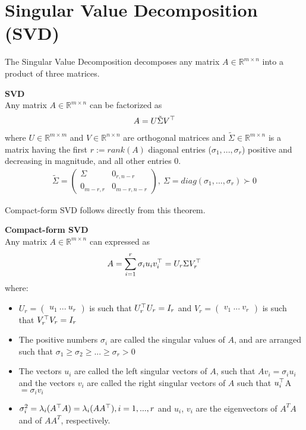 \documentclass[12pt]{article}
\begin{document}
\section{Singular Value Decomposition (SVD)}
The Singular Value Decomposition decomposes any matrix $A \in \mathbb{R}^{m \times n}$ into a product of three matrices. 
\begin{theorem} \textbf{SVD}\\
Any matrix $A \in \mathbb{R}^{m \times n}$ can be factorized as \begin{gather*}
    A = U\tilde{\Sigma}V^\top
\end{gather*}
where $U \in \mathbb{R}^{m \times m}$ and $V \in \mathbb{R}^{n \times n}$ are orthogonal matrices and $\tilde{\Sigma} \in \mathbb{R}^{m \times n}$ is a matrix having the first $r := rank(A)$ diagonal entries ($\sigma_1, ..., \sigma_r$) positive and decreasing in magnitude, and all other entries $0$.
\begin{gather*}
    \tilde{\Sigma} = \begin{pmatrix} \Sigma & 0_{r, n-r} \\ 0_{m-r, r} & 0_{m-r, n-r}\end{pmatrix}, \ \Sigma = diag(\sigma_1, ..., \sigma_r)\succ 0
\end{gather*}
\end{theorem}
\noindent Compact-form SVD follows directly from this theorem.
\begin{corollary} \textbf{Compact-form SVD} \\
Any matrix $A \in \mathbb{R}^{m \times n}$ can expressed as
\begin{gather*}
    A = \sum_{i=1}^r \sigma_i u_iv_i^\top = U_r\Sigma V_r^\top
\end{gather*}
where:
\begin{itemize}
    \item $U_r = \begin{pmatrix} u_1 \ ... \ u_r \end{pmatrix}$ is such that $U_r^\top U_r = I_r$ and $V_r = \begin{pmatrix} v_1 \ ... \ v_r \end{pmatrix}$ is such that $V_r^\top V_r = I_r$
    \item The positive numbers $\sigma_i$ are called the singular values of $A$, and are arranged such that $\sigma_1 \geq \sigma_2 \geq ... \geq \sigma_r > 0$
    \item The vectors $u_i$ are called the left singular vectors of $A$, such that $Av_i= \sigma_iu_i$ and the vectors $v_i$ are called the right singular vectors of $A$ such that $u_i^\top$A$= \sigma_iv_i$
    \item $\sigma_i^2=\lambda_i(A^\top A) =\lambda_i(AA^\top), i= 1,...,r$ and $u_i$, $v_i$ are the eigenvectors of $A^TA$ and of $AA^T$, respectively.
\end{itemize}
\end{corollary}
\end{document}
